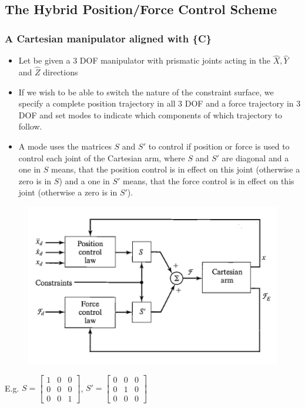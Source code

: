 \documentclass[10pt,a4paper]{article}
\begin{document}
\subsection{The Hybrid Position/Force Control Scheme}
\subsubsection{A Cartesian manipulator aligned with \{C\}}
\begin{itemize}
	\item Let be given a 3 DOF manipulator with prismatic joints acting in the $\hat{X}, \hat{Y}$ and $\hat{Z}$ directions
	\item If we wish to be able to switch the nature of the constraint surface, we specify a complete position trajectory in all 3 DOF and a force trajectory in 3 DOF and set modes to indicate which components of which trajectory to follow.
	\item A mode uses the matrices $S$ and $S'$ to control if position or force is used to control each joint of the Cartesian arm, where $S$ and $S'$ are diagonal and a one in $S$ means, that the position control is in effect on this joint (otherwise a zero is in $S$) and a one in $S'$ means, that the force control is in effect on this joint (otherwise a zero is in $S'$).
\end{itemize}

\begin{figure}[H]
	\includegraphics[width=0.5\columnwidth]{imgs/hybrid_control_cartesian.png}
\end{figure}

E.g. $S = \begin{bmatrix}
	1 & 0 & 0 \\
	0 & 0 & 0 \\
	0 & 0 & 1
\end{bmatrix}$, 
$S' = \begin{bmatrix}
	0 & 0 & 0 \\
	0 & 1 & 0 \\
	0 & 0 & 0
\end{bmatrix}$
\end{document}
